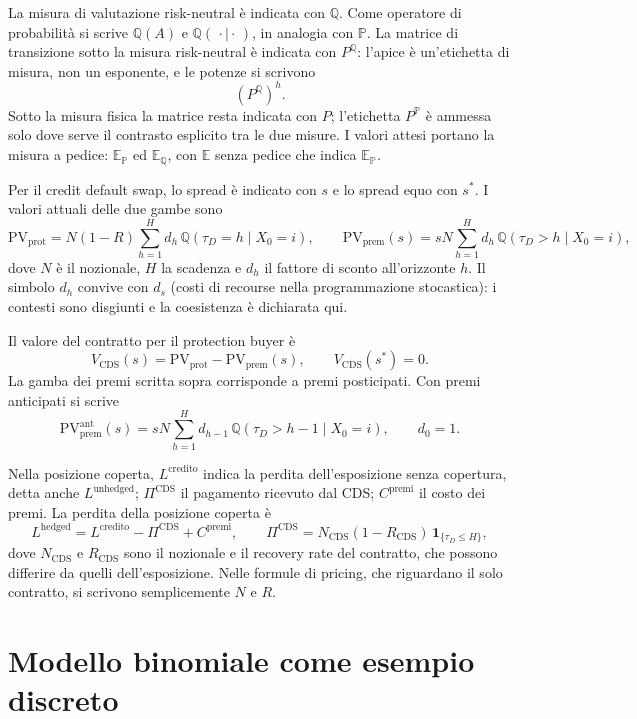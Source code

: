 \documentclass[12pt,a4paper]{article}
\newcommand{\E}{\mathbb{E}}
\newcommand{\Prob}{\mathbb{P}}
\newcommand{\Q}{\mathbb{Q}}
\newcommand{\1}{\mathbf{1}}
\begin{document}
La misura di valutazione risk-neutral \`e indicata con $\Q$. Come
operatore di probabilit\`a si scrive $\Q(A)$ e
$\Q(\,\cdot\mid\cdot\,)$, in analogia con $\Prob$. La matrice di
transizione sotto la misura risk-neutral \`e indicata con $P^{\Q}$:
l'apice \`e un'etichetta di misura, non un esponente, e le potenze si
scrivono
\[
\left(P^{\Q}\right)^h.
\]
Sotto la misura fisica la matrice resta indicata con $P$; l'etichetta
$P^{\Prob}$ \`e ammessa solo dove serve il contrasto esplicito tra le
due misure. I valori attesi portano la misura a pedice: $\E_{\Prob}$ ed
$\E_{\Q}$, con $\E$ senza pedice che indica $\E_{\Prob}$.

Per il credit default swap, lo spread \`e indicato con $s$ e lo spread
equo con $s^{*}$. I valori attuali delle due gambe sono
\[
\mathrm{PV}_{\mathrm{prot}}
=
N(1-R)\sum_{h=1}^{H}d_h\,\Q(\tau_D=h\mid X_0=i),
\qquad
\mathrm{PV}_{\mathrm{prem}}(s)
=
sN\sum_{h=1}^{H}d_h\,\Q(\tau_D>h\mid X_0=i),
\]
dove $N$ \`e il nozionale, $H$ la scadenza e $d_h$ il fattore di sconto
all'orizzonte $h$. Il simbolo $d_h$ convive con $d_s$ (costi di recourse
nella programmazione stocastica): i contesti sono disgiunti e la
coesistenza \`e dichiarata qui.

Il valore del contratto per il protection buyer \`e
\[
V_{\mathrm{CDS}}(s)=\mathrm{PV}_{\mathrm{prot}}-\mathrm{PV}_{\mathrm{prem}}(s),
\qquad
V_{\mathrm{CDS}}(s^{*})=0.
\]
La gamba dei premi scritta sopra corrisponde a premi posticipati. Con premi
anticipati si scrive
\[
\mathrm{PV}_{\mathrm{prem}}^{\mathrm{ant}}(s)
=
sN\sum_{h=1}^{H}d_{h-1}\,\Q(\tau_D>h-1\mid X_0=i),
\qquad
d_0=1.
\]

Nella posizione coperta, $L^{\mathrm{credito}}$ indica la perdita
dell'esposizione senza copertura, detta anche $L^{\mathrm{unhedged}}$;
$\Pi^{\mathrm{CDS}}$ il pagamento ricevuto dal CDS; $C^{\mathrm{premi}}$ il
costo dei premi. La perdita della posizione coperta \`e
\[
L^{\mathrm{hedged}}
=
L^{\mathrm{credito}}-\Pi^{\mathrm{CDS}}+C^{\mathrm{premi}},
\qquad
\Pi^{\mathrm{CDS}}
=
N_{\mathrm{CDS}}(1-R_{\mathrm{CDS}})\,\1_{\{\tau_D\leq H\}},
\]
dove $N_{\mathrm{CDS}}$ e $R_{\mathrm{CDS}}$ sono il nozionale e il
recovery rate del contratto, che possono differire da quelli
dell'esposizione. Nelle formule di pricing, che riguardano il solo
contratto, si scrivono semplicemente $N$ e $R$.

\section{Modello binomiale come esempio discreto}
\end{document}
